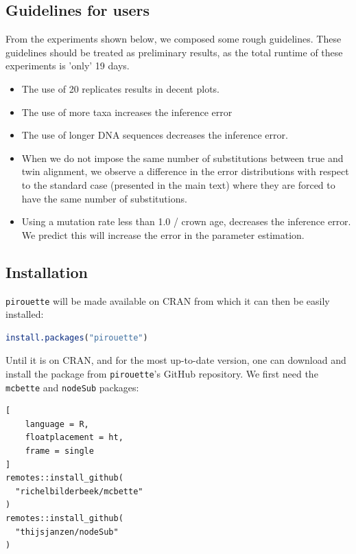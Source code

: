 \subsection{Guidelines for users}
\label{subsec:guidelines}

From the experiments shown below, we composed some rough guidelines.
These guidelines should be treated as preliminary results, as
the total runtime of these experiments is 'only' 19 days.

\begin{itemize}
  \item{
    The use of 20 replicates results in decent plots.
  }
  \item{
    The use of more taxa increases the inference error
  }
  \item{
    The use of longer DNA sequences decreases the inference error.
  }
  \item{
    When we do not impose the same number of substitutions 
    between true and twin alignment, we observe a difference in the error 
    distributions with respect to the standard case (presented in the main 
    text) where they are forced to have the same number of substitutions.
  }
  \item{
    Using a mutation rate less than 1.0 / crown age, decreases the
    inference error. We predict this will increase the error in the parameter
    estimation.
  }
\end{itemize}

\subsection{Installation}
\label{subsec:installation}

\verb;pirouette; will be made available on CRAN from which 
it can then be easily installed:
\begin{lstlisting}[language=R, floatplacement=ht, frame=single]
install.packages("pirouette")
\end{lstlisting}

Until it is on CRAN, and for the most up-to-date version, 
one can download and install the package from \verb;pirouette;'s GitHub 
repository. We first need the \verb;mcbette; and \verb;nodeSub; packages:
\begin{lstlisting}[
    language = R,
    floatplacement = ht,
    frame = single
]
remotes::install_github(
  "richelbilderbeek/mcbette"
)
remotes::install_github(
  "thijsjanzen/nodeSub"
)
\end{lstlisting}

